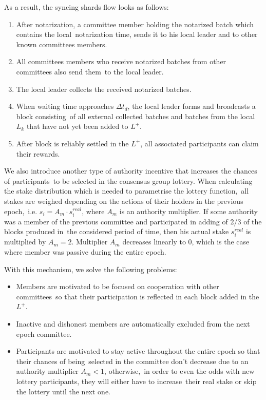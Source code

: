 As a result, the syncing shards flow looks as follows:
\begin{enumerate}
    \item After notarization, a committee member holding the notarized batch which contains the local\
    notarization time, sends it to his local leader and to other known committees members.
    \item All committees members who receive notarized batches from other committees also send them\
    to the local leader.
    \item The local leader collects the received notarized batches.
    \item When waiting time approaches $\Delta t_d$, the local leader forms and broadcasts a block consisting\
    of all external collected batches and batches from the local $L_k$ that have not yet been added to $L^+$.
    \item After block is reliably settled in the $L^+$, all associated participants can claim their rewards.
\end{enumerate}

We also introduce another type of authority incentive that increases the chances of participants\
to be selected in the consensus group lottery.
When calculating the stake distribution which is needed to parametrise the lottery function,\
all stakes are weighed depending on the actions of their holders in the previous epoch,\
i.e. ${s_i = A_m \cdot s_i^{real}}$, where $A_m$ is an authority multiplier.
If some authority was a member of the previous committee and participated in adding of 2/3 of the blocks produced in\
the considered period of time, then his actual stake ${s_i^{real}}$ is multiplied by ${A_m = 2}$.
Multiplier $A_m$ decreases linearly to 0, which is the case where member was passive during the entire epoch.

With this mechanism, we solve the following problems:
\begin{itemize}
    \item Members are motivated to be focused on cooperation with other committees\
    so that their participation is reflected in each block added in the $L^+$.
    \item Inactive and dishonest members are automatically excluded from the next epoch committee.
    \item Participants are motivated to stay active throughout the entire epoch so that their chances of being\
    selected in the committee don't decrease due to an authority multiplier ${A_m < 1}$, otherwise,\
    in order to even the odds with new lottery participants, they will either have to increase\
    their real stake or skip the lottery until the next one.
\end{itemize}

